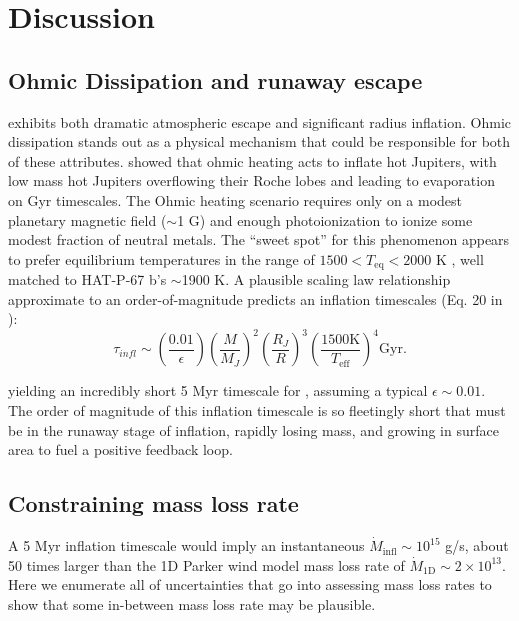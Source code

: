 \documentclass[twocolumn]{aastex631}
\newcommand{\hatpb}{\object{HAT-P-67 b}}
\begin{document}
\section{Discussion} \label{secDiscuss}

\subsection{Ohmic Dissipation and runaway escape}
 exhibits both dramatic atmospheric escape and significant radius inflation.  Ohmic dissipation stands out as a physical mechanism that could be responsible for both of these attributes.  \citet{2011ApJ...738....1B} showed that ohmic heating acts to inflate hot Jupiters, with low mass hot Jupiters overflowing their Roche lobes and leading to evaporation on Gyr timescales.  The Ohmic heating scenario requires only on a modest planetary magnetic field ($\sim$1 G) and enough photoionization to ionize some modest fraction of neutral metals.  The ``sweet spot'' for this phenomenon appears to prefer equilibrium temperatures in the range of $1500<T_\mathrm{eq}<2000$ K \citep{2011ApJ...738....1B}, well matched to HAT-P-67 b's $\sim$1900 K.  A plausible scaling law relationship approximate to an order-of-magnitude predicts an inflation timescales (Eq. 20 in \citet{2011ApJ...738....1B}):
\begin{equation}
    \tau_{\textit{infl}}\sim \left(\frac{0.01}{\epsilon} \right) \left(\frac{M}{M_{J}}\right)^2 \left(\frac{R_{J}}{R}\right)^3 \left(\frac{1500 \textrm{K}}{T_\mathrm{eff}}\right)^4 \textrm{Gyr}. \label{eqInflate}
\end{equation}


\noindent yielding an incredibly short 5 Myr timescale for \hatpb, assuming a typical $\epsilon\sim0.01$. The order of magnitude of this inflation timescale is so fleetingly short that \hatpb must be in the runaway stage of inflation, rapidly losing mass, and growing in surface area to fuel a positive feedback loop.


\subsection{Constraining mass loss rate}
A 5 Myr inflation timescale would imply an instantaneous $\dot{M}_\mathrm{infl}\sim10^{15}$ g/s, about 50 times larger than the 1D Parker wind model mass loss rate of $\dot{M}_\mathrm{1D}\sim2\times10^{13}$. Here we enumerate all of uncertainties that go into assessing mass loss rates to show that some in-between mass loss rate may be plausible.
\end{document}

